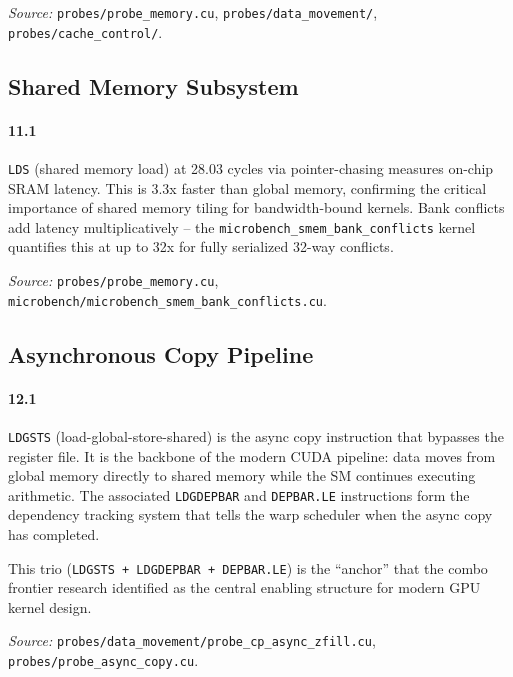 \textit{Source:} \texttt{probes/probe\_memory.cu},
\texttt{probes/data\_movement/}, \texttt{probes/cache\_control/}.

\subsection{Shared Memory Subsystem}
\label{par:smem}

\paragraph{11.1}
\texttt{LDS} (shared memory load) at 28.03 cycles via pointer-chasing
measures on-chip SRAM latency.  This is 3.3x faster than global memory,
confirming the critical importance of shared memory tiling for
bandwidth-bound kernels.  Bank conflicts add latency multiplicatively --
the \texttt{microbench\_smem\_bank\_conflicts} kernel quantifies this at
up to 32x for fully serialized 32-way conflicts.

\textit{Source:} \texttt{probes/probe\_memory.cu},
\texttt{microbench/microbench\_smem\_bank\_conflicts.cu}.

\subsection{Asynchronous Copy Pipeline}
\label{par:async}

\paragraph{12.1}
\texttt{LDGSTS} (load-global-store-shared) is the async copy instruction
that bypasses the register file.  It is the backbone of the modern CUDA
pipeline: data moves from global memory directly to shared memory while
the SM continues executing arithmetic.  The associated \texttt{LDGDEPBAR}
and \texttt{DEPBAR.LE} instructions form the dependency tracking system
that tells the warp scheduler when the async copy has completed.

This trio (\texttt{LDGSTS + LDGDEPBAR + DEPBAR.LE}) is the ``anchor''
that the combo frontier research identified as the central enabling
structure for modern GPU kernel design.

\textit{Source:} \texttt{probes/data\_movement/probe\_cp\_async\_zfill.cu},
\texttt{probes/probe\_async\_copy.cu}.

